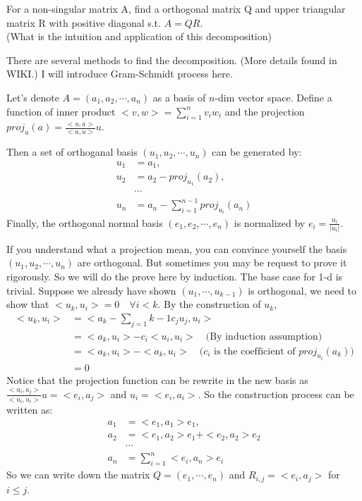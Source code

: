 \begin{exe}[QR Decomposition]
For a non-singular matrix A, find a orthogonal matrix Q and upper triangular matrix R with positive diagonal s.t. $A=QR$.\\
(What is the intuition and application of this decomposition)
\end{exe}
\begin{teacher}
\begin{sol}
There are several methods to find the decomposition. (More details found in WIKI.)  I will introduce Gram-Schmidt process here.

Let's denote $A=(a_1, a_2, \cdots, a_n)$ as a basis of $n$-dim vector space. Define a function of inner product $<v, w>=\sum_{i=1}^n v_iw_i$ and the projection $proj_u(a) = \frac{<u,a>}{<u,u>}u$. 

Then a set of orthoganal basis $(u_1, u_2, \cdots, u_n)$ can be generated by:
\begin{align*}
    u_1&=a_1,\\
    u_2&=a_2-proj_{u_1}(a_2),\\
    &\cdots\\
    u_n&=a_n-\sum_{i=1}^{n-1}proj_{u_i}(a_n)
\end{align*}
Finally, the orthogonal normal basis $(e_1, e_2, \cdots, e_n)$ is normalized by $e_i = \frac{u_i}{|u_i|}$. 

If you understand what a projection mean, you can convince yourself the basis $(u_1, u_2, \cdots, u_n)$ are orthogonal. But sometimes you may be request to prove it rigorously. So we will do the prove here by induction. The base case for 1-d is trivial. Suppose we already have shown $(u_1,\cdots,u_{k-1})$ is orthogonal, we need to show that $<u_k, u_i>=0 \quad \forall i<k$. By the construction of $u_k$, 
\begin{align*}
<u_k, u_i>&=<a_k-\sum_{j=1}{k-1}c_j u_j, u_i>\\
&= <a_k,u_i> - c_i<u_i,u_i> \quad \text{(By induction assumption)}\\
&= <a_k,u_i> - <a_k, u_i> \quad \text{($c_i$ is the coefficient of $proj_{u_i}(a_k)$)}\\
&=0
\end{align*}
Notice that the projection function can be rewrite in the new basis as $\frac{<u_i,a_j>}{<u_i,u_i>}u=<e_i,a_j>$ and $u_i = <e_i, a_i>$. So the construction process can be written as:
\begin{align*}
    a_1&=<e_1,a_1>e_1,\\
    a_2&=<e_1,a_2>e_1+<e_2,a_2>e_2\\
    &\cdots\\
    a_n&=\sum_{i=1}^{n}<e_i,a_n>e_i
\end{align*}
So we can write down the matrix $Q=(e_1, \cdots, e_n)$ and $R_{i,j} = <e_i, a_j>$ for $i\leq j$.


\end{sol}
\end{teacher}
